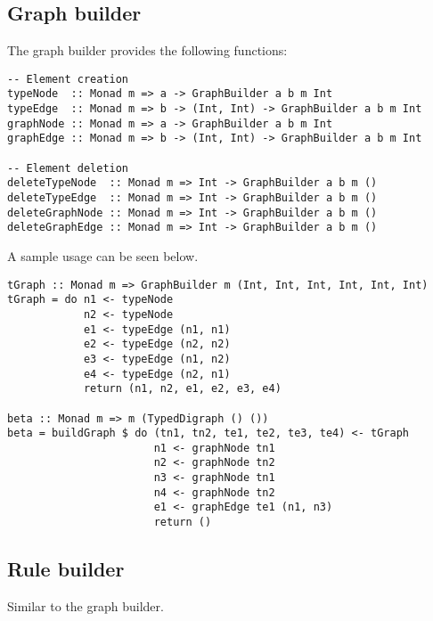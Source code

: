 \documentclass[a4paper]{report}
\begin{document}
\subsection{Graph builder}
The graph builder provides the following functions:
\begin{verbatim}
-- Element creation
typeNode  :: Monad m => a -> GraphBuilder a b m Int
typeEdge  :: Monad m => b -> (Int, Int) -> GraphBuilder a b m Int
graphNode :: Monad m => a -> GraphBuilder a b m Int
graphEdge :: Monad m => b -> (Int, Int) -> GraphBuilder a b m Int

-- Element deletion
deleteTypeNode  :: Monad m => Int -> GraphBuilder a b m ()
deleteTypeEdge  :: Monad m => Int -> GraphBuilder a b m ()
deleteGraphNode :: Monad m => Int -> GraphBuilder a b m ()
deleteGraphEdge :: Monad m => Int -> GraphBuilder a b m ()
\end{verbatim}

A sample usage can be seen below.

\begin{verbatim}
tGraph :: Monad m => GraphBuilder m (Int, Int, Int, Int, Int, Int)
tGraph = do n1 <- typeNode
            n2 <- typeNode
            e1 <- typeEdge (n1, n1)
            e2 <- typeEdge (n2, n2)
            e3 <- typeEdge (n1, n2)
            e4 <- typeEdge (n2, n1)
            return (n1, n2, e1, e2, e3, e4)

beta :: Monad m => m (TypedDigraph () ())
beta = buildGraph $ do (tn1, tn2, te1, te2, te3, te4) <- tGraph
                       n1 <- graphNode tn1
                       n2 <- graphNode tn2
                       n3 <- graphNode tn1
                       n4 <- graphNode tn2
                       e1 <- graphEdge te1 (n1, n3)
                       return ()
\end{verbatim}

\subsection{Rule builder}
Similar to the graph builder.
\end{document}
